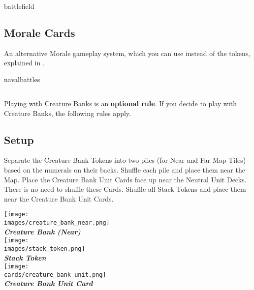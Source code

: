 \begin{multicols*}{2}
\vspace*{1em}
\begin{expansion}{battlefield}
	\subsection*{Morale Cards}
	An alternative Morale gameplay system, which you can use instead of the tokens, explained in .
\end{expansion}
\end{multicols*}

\begin{expansion}[before=\vspace*{-11mm}]{navalbattles}
  \begin{multicols*}{2}
  \subsection*{}
  Playing with Creature Banks is an \textbf{optional rule}.
  If you decide to play with Creature Banks, the following rules apply.

  \bigskip
  \subsection*{Setup}
  Separate the Creature Bank Tokens into two piles (for Near and Far Map Tiles) based on the numerals on their backs.
  Shuffle each pile and place them near the Map.
  Place the Creature Bank Unit Cards face up near the Neutral Unit Decks.
  There is no need to shuffle these Cards.
  Shuffle all Stack Tokens and place them near the Creature Bank Unit Cards.

  \bigskip
  \begin{multicols*}{2}
    \begin{center}
      \texttt{[image: \\images/creature\_bank\_near.png]}\\
      \vspace{-0.5em}\textbf{\footnotesize\textit{\textcolor{darkcandyapplered}{Creature Bank (Near)}}}\\
      \vspace*{\fill}
      \texttt{[image: \\images/stack\_token.png]}\\
      \textbf{\footnotesize\textit{\textcolor{darkcandyapplered}{Stack Token}}}\\
      \columnbreak
      \texttt{[image: \\cards/creature\_bank\_unit.png]}\\
      \textbf{\footnotesize\textit{\textcolor{darkcandyapplered}{Creature Bank Unit Card}}}
    \end{center}
  \end{multicols*}


\end{multicols*}
\end{expansion}
